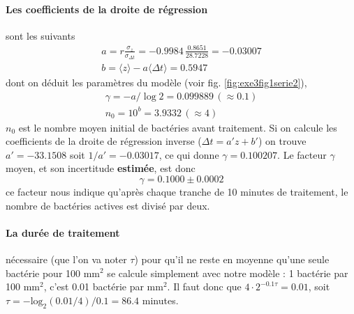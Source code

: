 \paragraph{Les coefficients de la droite de régression} sont les suivants
\begin{gather*}
a=r\frac{\sigma_z}{\sigma_{\Delta t}}=-0.9984\,\frac{0.8651}{28.7228}=-0.03007\\
b=\langle z\rangle-a\langle\Delta t\rangle=0.5947
\end{gather*}
dont on déduit les paramètres du modèle (voir fig. \ref{fig:exe3fig1serie2}),
\begin{gather*}
\gamma=-a/\log{2}=0.099889\,(\approx0.1)\\
n_0=10^b=3.9332\,(\approx 4)
\end{gather*}
$n_0$ est le nombre moyen initial de bactéries avant traitement. Si on calcule les coefficients de la droite de régression inverse ($\Delta t = a' z +b'$) on trouve $a'=-33.1508$ soit $1/a'=-0.03017$, ce qui donne $\gamma=0.100207$. Le facteur $\gamma$ moyen, et son incertitude \textbf{estimée}, est donc
$$
\gamma=0.1000\pm0.0002
$$
ce facteur nous indique qu'après chaque tranche de 10 minutes de traitement, le nombre de bactéries actives est divisé par deux.

\paragraph{La durée de traitement} nécessaire (que l'on va noter $\tau$) pour qu'il ne reste en moyenne qu'une seule bactérie pour 100 mm$^2$ se calcule simplement avec notre modèle : 1 bactérie par 100 mm$^2$, c'est 0.01 bactérie par mm$^2$. Il faut donc que $4\cdot2^{-0.1\tau}=0.01$, soit $\tau=-\text{log}_2(0.01/4)/0.1=86.4$ minutes.

